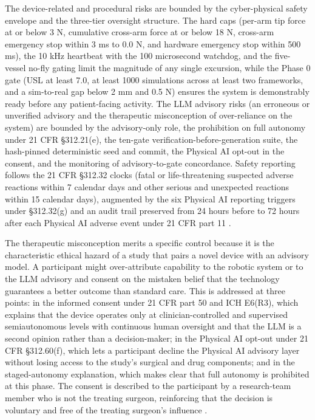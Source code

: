 The device-related and procedural risks are bounded by the cyber-physical safety
envelope and the three-tier oversight structure. The hard caps (per-arm tip force at
or below 3 N, cumulative cross-arm force at or below 18 N, cross-arm emergency stop
within 3 ms to 0.0 N, and hardware emergency stop within 500 ms), the 10 kHz
heartbeat with the 100 microsecond watchdog, and the five-vessel no-fly gating limit
the magnitude of any single excursion, while the Phase 0 gate (USL at least 7.0, at
least 1000 simulations across at least two frameworks, and a sim-to-real gap below 2
mm and 0.5 N) ensures the system is demonstrably ready before any patient-facing
activity. The LLM advisory risks (an erroneous or unverified advisory and the
therapeutic misconception of over-reliance on the system) are bounded by the
advisory-only role, the prohibition on full autonomy under 21 CFR \S 312.21(e), the
ten-gate verification-before-generation suite, the hash-pinned deterministic seed
and commit, the Physical AI opt-out in the consent, and the monitoring of
advisory-to-gate concordance. Safety reporting follows the 21 CFR \S 312.32 clocks
(fatal or life-threatening suspected adverse reactions within 7 calendar days and
other serious and unexpected reactions within 15 calendar days), augmented by the
six Physical AI reporting triggers under \S 312.32(g) and an audit trail preserved
from 24 hours before to 72 hours after each Physical AI adverse event under 21 CFR
part 11 \cite{cfr312paiuni,congress9510}.

The therapeutic misconception merits a specific control because it is the
characteristic ethical hazard of a study that pairs a novel device with an
advisory model. A participant might over-attribute capability to the robotic system
or to the LLM advisory and consent on the mistaken belief that the technology
guarantees a better outcome than standard care. This is addressed at three points:
in the informed consent under 21 CFR part 50 and ICH E6(R3), which explains that the
device operates only at clinician-controlled and supervised semiautonomous levels
with continuous human oversight and that the LLM is a second opinion rather than a
decision-maker; in the Physical AI opt-out under 21 CFR \S 312.60(f), which lets a
participant decline the Physical AI advisory layer without losing access to the
study's surgical and drug components; and in the staged-autonomy explanation, which
makes clear that full autonomy is prohibited at this phase. The consent is described
to the participant by a research-team member who is not the treating surgeon,
reinforcing that the decision is voluntary and free of the treating surgeon's
influence \cite{cfr050paiuni,clintrustpai}.

